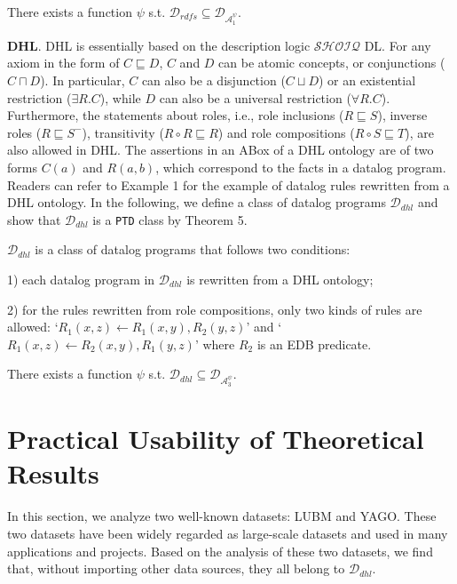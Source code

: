 \documentclass{article}
\begin{document}
\begin{theorem} There exists a function $\psi$ s.t. $\mathcal{D}_{rdfs}\subseteq\mathcal{D}_{\mathcal{A}_1^{\psi}}$.
\end{theorem}

\textbf{DHL}. DHL \cite{DBLP:conf/www/GrosofHVD03} is essentially based on the description logic $\mathcal{SHOIQ}$
DL. For any axiom in the form of $C\sqsubseteq D$, $C$ and $D$ can be atomic concepts, or conjunctions ($C\sqcap D$).
In particular, $C$ can also be a disjunction ($C\sqcup D$) or an existential restriction ($\exists R.C$), while $D$
can also be a universal restriction ($\forall R.C$). Furthermore, the statements about roles, i.e., role inclusions ($R\sqsubseteq S$), inverse roles ($R\sqsubseteq S^-$), transitivity ($R\circ R\sqsubseteq R$) and role compositions ($R\circ S\sqsubseteq T$), are also allowed in DHL.
The assertions in
an ABox of a DHL ontology are of two forms $C(a)$ and $R(a,b)$, which correspond to the facts
in a datalog program. Readers can refer to Example 1 for
the example of datalog rules rewritten from a DHL ontology.
In the following, we define a class of datalog programs $\mathcal{D}_{dhl}$ and
show that $\mathcal{D}_{dhl}$ is a \texttt{PTD} class by Theorem 5.

\begin{definition}\label{def:ddhl} $\mathcal{D}_{dhl}$ is a class of datalog programs that follows two conditions:

1) each datalog program in $\mathcal{D}_{dhl}$ is rewritten from a DHL ontology;

2) for the rules rewritten from role compositions, only two kinds of rules are allowed: `$R_1(x,z)\leftarrow R_1(x,y),R_2(y,z)$' and `$R_1(x,z)\leftarrow R_2(x,y),R_1(y,z)$'
where $R_2$ is an EDB predicate.
\end{definition}

\begin{theorem} There exists a function $\psi$ s.t. $\mathcal{D}_{dhl}\subseteq\mathcal{D}_{\mathcal{A}_3^{\psi}}$.
\end{theorem}

\section{Practical Usability of Theoretical Results}

In this section, we analyze two well-known datasets: LUBM and YAGO. These two datasets have been widely regarded as large-scale datasets and used in many applications and projects. Based on the analysis of these two datasets, we find that, without importing other data sources, they all belong to
$\mathcal{D}_{dhl}$.
\end{document}
